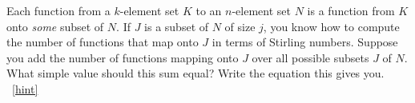 \documentclass{book}
\begin{document}
\setcounter{project}{204}
\addtocounter{project}{-1}
\begin{activity}[]\label{Stirlingfalling}
\hypertarget{p-1153}{}%
Each function from a \(k\)-element set \(K\) to an \(n\)-element set \(N\) is a function from \(K\) onto \emph{some} subset of \(N\). If \(J\) is a subset of \(N\) of size \(j\), you know how to compute the number of functions that map onto \(J\) in terms of Stirling numbers. Suppose you add the number of functions mapping onto \(J\) over all possible subsets \(J\) of \(N\). What simple value should this sum equal? Write the equation this gives you.%
~\hfill{\tiny\hyperlink{a-204}{[hint]}\hypertarget{q-204}{}}\end{activity}
\end{document}
